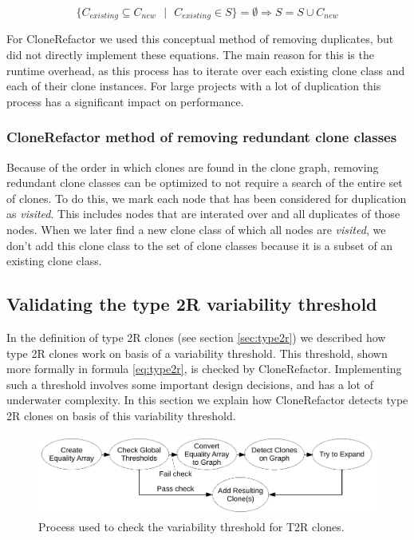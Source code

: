 \begin{equation}\label{eq:removeexisting}
\{C_{existing} \subseteq C_{new}\text{ }|\text{ }C_{existing} \in S\} = \emptyset \Rightarrow S = S \cup C_{new}
\end{equation}

For CloneRefactor we used this conceptual method of removing duplicates, but did not directly implement these equations. The main reason for this is the runtime overhead, as this process has to iterate over each existing clone class and each of their clone instances. For large projects with a lot of duplication this process has a significant impact on performance.

\subsubsection{CloneRefactor method of removing redundant clone classes}
Because of the order in which clones are found in the clone graph, removing redundant clone classes can be optimized to not require a search of the entire set of clones. To do this, we mark each node that has been considered for duplication as \textit{visited}. This includes nodes that are interated over and all duplicates of those nodes. When we later find a new clone class of which all nodes are \textit{visited}, we don't add this clone class to the set of clone classes because it is a subset of an existing clone class.


\subsection{Validating the type 2R variability threshold}
In the definition of type 2R clones (see section \ref{sec:type2r}) we described how type 2R clones work on basis of a variability threshold. This threshold, shown more formally in formula \ref{eq:type2r}, is checked by CloneRefactor. Implementing such a threshold involves some important design decisions, and has a lot of underwater complexity. In this section we explain how CloneRefactor detects type 2R clones on basis of this variability threshold.

\begin{figure}[H]
  \centering
  \includegraphics[width=1\columnwidth]{img/CloneRefactorT2RFlow}
  \caption{Process used to check the variability threshold for T2R clones.}
  \label{fig:clonerefactort2rflow}
\end{figure}


